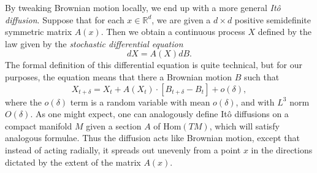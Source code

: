 \documentclass[12pt]{article}
\newcommand*{\R}{\mathbb{R}}
\begin{document}
By tweaking Brownian motion locally, we end up with a more general \emph{It\^{o} diffusion}. Suppose that for each $x \in \R^d$, we are given a $d \times d$ positive semidefinite symmetric matrix $A(x)$. Then we obtain a continuous process $X$ defined by the law given by the \emph{stochastic differential equation}
%
\[ dX = A(X) dB. \]
%
The formal definition of this differential equation is quite technical, but for our purposes, the equation means that there a Brownian motion $B$ such that
%
\[ X_{t + \delta} = X_t + A(X_t) \cdot [B_{t + \delta} - B_t] + o(\delta), \]
%
where the $o(\delta)$ term is a random variable with mean $o(\delta)$, and with $L^3$ norm $O(\delta)$.
%
%
As one might expect, one can analogously define It\^{o} diffusions on a compact manifold $M$ given a section $A$ of $\text{Hom}(TM)$, which will satisfy analogous formulae. Thus the diffusion acts like Brownian motion, except that instead of acting radially, it spreads out unevenly from a point $x$ in the directions dictated by the extent of the matrix $A(x)$.

%
%
\end{document}
